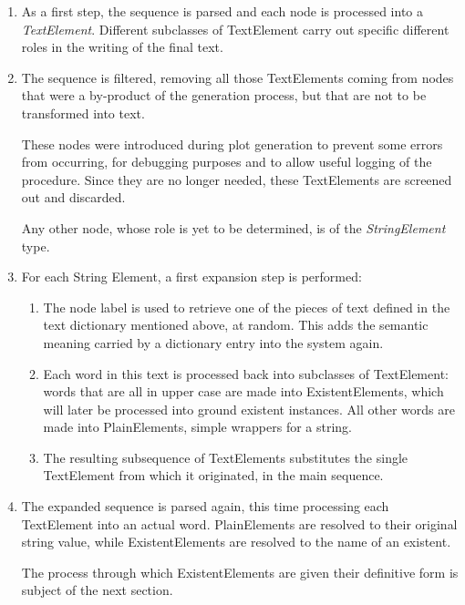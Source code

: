 \documentclass[12pt,a4paper,oneside]{report}
\begin{document}
\begin{enumerate}\setlength{\itemsep}{0pt}
\item As a first step, the sequence is parsed and each node is processed into a \textit{TextElement}. Different subclasses of TextElement carry out specific different roles in the writing of the final text.
\item The sequence is filtered, removing all those TextElements coming from nodes that were a by-product of the generation process, but that are not to be transformed into text. 

These nodes were introduced during plot generation to prevent some errors from occurring, for debugging purposes and to allow useful logging of the procedure. Since they are no longer needed, these TextElements are screened out and discarded. 

Any other node, whose role is yet to be determined, is of the \textit{StringElement} type.
\item For each String Element, a first expansion step is performed:
\begin{enumerate}\setlength{\itemsep}{0pt}
\item The node label is used to retrieve one of the pieces of text defined in the text dictionary mentioned above, at random. This adds the semantic meaning carried by a dictionary entry into the system again.
\item Each word in this text is processed back into subclasses of TextElement: words that are all in upper case are made into ExistentElements, which will later be processed into ground existent instances. All other words are made into PlainElements, simple wrappers for a string.
\item The resulting subsequence of TextElements substitutes the single TextElement from which it originated, in the main sequence.
\end{enumerate}
\item The expanded sequence is parsed again, this time processing each TextElement into an actual word. PlainElements are resolved to their original string value, while ExistentElements are resolved to the name of an existent.

The process through which ExistentElements are given their definitive form is subject of the next section.
\end{enumerate}
\end{document}
